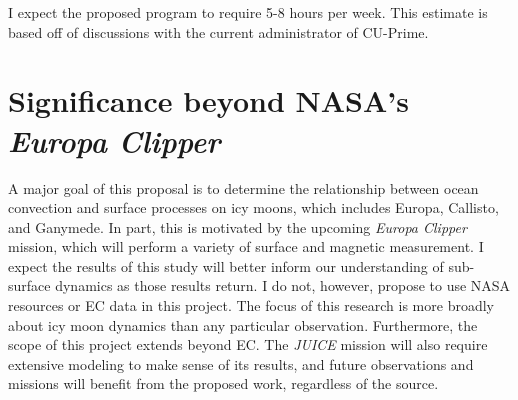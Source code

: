 \documentclass[12pt]{article}
\begin{document}
I expect the proposed program to require 5-8 hours per week. This estimate is based off of discussions with the current administrator of CU-Prime. 
\section{Significance beyond NASA's \textit{Europa Clipper}}
A major goal of this proposal is to determine the relationship between ocean convection and surface processes on icy moons, which includes Europa, Callisto, and Ganymede. In part, this is motivated by the upcoming \textit{Europa Clipper} mission, which will perform a variety of surface and magnetic measurement. I expect the results of this study will better inform our understanding of sub-surface dynamics as those results return. I do not, however, propose to use NASA resources or EC data in this project. The focus of this research is more broadly about icy moon dynamics than any particular observation. Furthermore, the scope of this project extends beyond EC. The \textit{JUICE} mission will also require extensive modeling to make sense of its results, and future observations and missions will benefit from the proposed work, regardless of the source.

\begin{spacing}{0.4}
\newpage
\printbibliography

\end{spacing}
\end{document}
